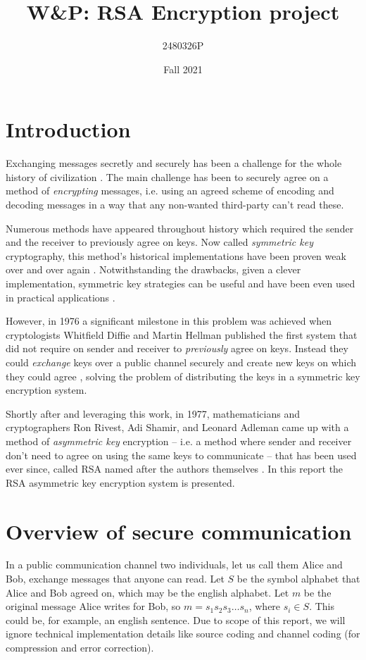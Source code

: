 \documentclass[11pt]{scrartcl}
\title{W\&P: RSA Encryption project}
\author{2480326P}
\date{Fall 2021}
\begin{document}
\section{Introduction}\label{intro}
Exchanging messages secretly and securely has been a challenge for the whole history of
civilization \cite{historyCrypto}. The main challenge has been to securely agree on a
method of \emph{encrypting} messages, i.e. using an agreed scheme of encoding and decoding
messages in a way that any non-wanted third-party can't read these. 

Numerous methods have appeared throughout history \cite{historyCrypto} which required the
sender and the receiver to previously agree on keys. Now called \emph{symmetric key}
cryptography, this method's historical implementations have been proven weak over and over
again \cite{historyCrypto}.  Notwithstanding the drawbacks, given a clever implementation,
symmetric key strategies can be useful and have been even used in practical applications
\cite{AESpaper}. 

However, in 1976 a significant milestone in this problem was achieved when cryptologists
Whitfield Diffie and Martin Hellman published the first system that did not require on
sender and receiver to \emph{previously} agree on keys. Instead they could \emph{exchange}
keys over a public channel securely and create new keys on which they could agree
\cite{diffieHellman}, solving the problem of distributing the keys in a symmetric key
encryption system.

Shortly after and leveraging this work, in 1977, mathematicians and cryptographers Ron
Rivest, Adi Shamir, and Leonard Adleman came up with a method of \emph{asymmetric key}
encryption -- i.e. a method where sender and receiver don't need to agree on using the same keys to
communicate -- that has been used ever since, called RSA named after the authors
themselves \cite{rsaPaper}. In this report the RSA asymmetric key encryption system is presented.

\section{Overview of secure communication}\label{overview}
In a public communication channel two individuals, let us call them Alice and Bob,
exchange messages that anyone can read. Let $S$ be the symbol alphabet that Alice and Bob
agreed on, which may be the english alphabet. Let $m$ be the original message Alice writes
for Bob, so $m=s_1 s_2 s_3\dots s_n$, where $s_i\in S$. This could be, for example, an
english sentence.  Due to scope of this report, we will ignore technical implementation
details like source coding and channel coding (for compression and error correction). 
\end{document}
